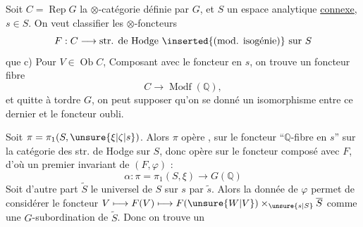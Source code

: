 Soit $C=\operatorname{Rep}G$ la $\otimes$-catégorie définie par $G$, et $S$ un espace analytique \uline{connexe}, $s\in S$. On veut classifier les $\otimes$-foncteurs
\[
F:C\longrightarrow\text{str. de Hodge \inserted{(mod. isogénie)} sur }S
\]
 que c) Pour   $V\in\operatorname{Ob}C$,  
Composant avec le foncteur  en $s$, on trouve un foncteur fibre
\[
C\longrightarrow\operatorname{Modf}(\mathbb{Q}),
\]
et quitte à tordre $G$, on peut supposer qu'on se donné un isomorphisme \inserted{$\varphi$} entre ce dernier et le foncteur oubli.

 Soit $\pi=\pi_1(S,\unsure{\xi|\zeta|s})$. Alors $\pi$ opère , sur le foncteur  ``$\mathbb{Q}$-fibre en $s$'' sur la catégorie des str. de Hodge sur $S$, donc opère sur le foncteur composé avec $F$, d'où un premier invariant de $(F,\varphi)$ :
\[
\alpha:\pi=\pi_1(S,\xi)\longrightarrow G(\mathbb{Q})
\]
Soit d'autre part $\widetilde{S}$ le  universel de $S$   sur $s$ par $\widetilde{s}$. Alors la donnée de $\varphi$ permet de considérer le foncteur $V\longmapsto F(V)\longmapsto F(\unsure{W|V})\times_{\unsure{s|S}}\overline{S}$ comme une $G$-subordination de $\widetilde{S}$. Donc on trouve un

